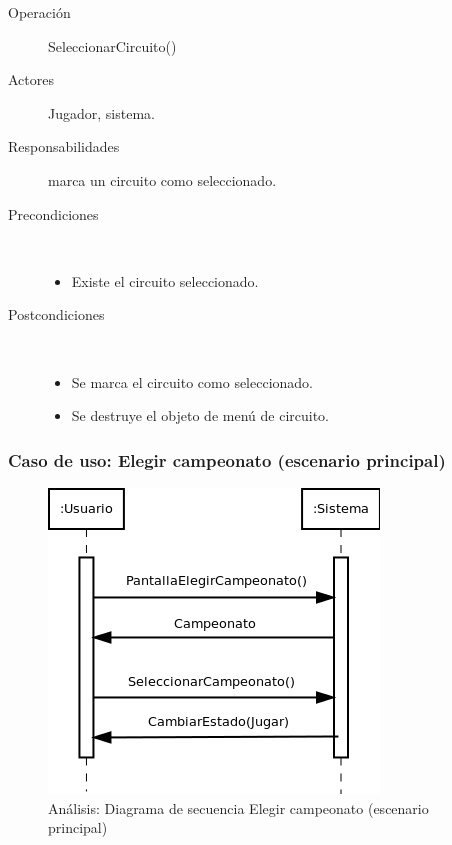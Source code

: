 \begin{description}
    \item [Operación] SeleccionarCircuito()
    \item [Actores] Jugador, sistema.
    \item [Responsabilidades] marca un circuito como seleccionado.
    \item [Precondiciones] $\quad$
        \begin{itemize}
            \item Existe el circuito seleccionado.
        \end{itemize}
    \item [Postcondiciones] $\quad$
        \begin{itemize}
            \item Se marca el circuito como seleccionado.
            \item Se destruye el objeto de menú de circuito.
        \end{itemize}
\end{description}

\subsubsection{Caso de uso: Elegir campeonato (escenario principal)}

\begin{figure}[H] 
  \label{secuencia_elegir_campeonato}
  \begin{center}
    \includegraphics[scale=0.6]{imagenes/analisis/secuencia_elegir_campeonato.png}
  \end{center}
  \caption{Análisis: Diagrama de secuencia Elegir campeonato (escenario principal)}
\end{figure}

